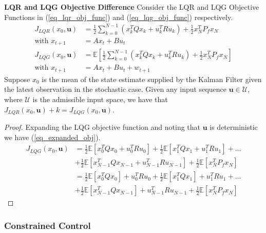 \documentclass[../masters.tex]{subfiles}
\begin{document}
\begin{thrm}
\textbf{LQR and LQG Objective Difference} Consider the LQR and LQG Objective Functions in (\ref{eq_lqr_obj_func}) and (\ref{eq_lqg_obj_func}) respectively. 
\begin{align}
J_{LQR}(x_0, \mathbf{u}) &= \frac{1}{2}\sum_{k=0}^{N-1} \left( x_k^TQx_k + u_k^TRu_k \right) + \frac{1}{2}x_N^TP_fx_N \label{eq_lqr_obj_func}\\
\text{with } x_{t+1} &= Ax_t +Bu_t \nonumber\\
J_{LQG}(x_0, \mathbf{u}) &=  \mathbb{E}\left[ \frac{1}{2}\sum_{k=0}^{N-1} \left( x_k^TQx_k + u_k^TRu_k \right) + \frac{1}{2}x_N^TP_fx_N \right] \label{eq_lqg_obj_func} \\
\text{with } x_{t+1} &= Ax_t +Bu_t + w_{t+1} \nonumber
\end{align}
Suppose $x_0$ is the mean of the state estimate supplied by the Kalman Filter given the latest observation in the stochastic case. Given any input sequence $\mathbf{u} \in \mathcal{U}$, where $\mathcal{U}$ is the admissible input space, we have that $J_{LQR}(x_0, \mathbf{u}) + k = J_{LQG}(x_0, \mathbf{u})$.
\end{thrm}
\begin{proof}
Expanding the LQG objective function and noting that $\mathbf{u}$ is deterministic we have (\ref{eq_expanded_obj}).
\begin{equation}
\begin{aligned}
J_{LQG}(x_0, \mathbf{u}) &= \frac{1}{2} \mathbb{E}\left[x_0^TQx_0 + u_0^TRu_0 \right] + \frac{1}{2} \mathbb{E}\left[x_1^TQx_1 + u_1^TRu_1 \right] + ... \\ &+ \frac{1}{2} \mathbb{E}\left[x_{N-1}^TQx_{N-1} + u_{N-1}^TRu_{N-1} \right] + \frac{1}{2} \mathbb{E}\left[x_N^TP_fx_N \right] \\
&= \frac{1}{2} \mathbb{E}\left[x_0^TQx_0\right] + u_0^TRu_0 + \frac{1}{2} \mathbb{E}\left[x_1^TQx_1\right] + u_1^TRu_1 + ... \\ &+ \frac{1}{2} \mathbb{E}\left[x_{N-1}^TQx_{N-1} \right]+ u_{N-1}^TRu_{N-1} + \frac{1}{2} \mathbb{E}\left[x_N^TP_fx_N \right]
\end{aligned}
\label{eq_expanded_obj}
\end{equation}
\end{proof}


\subsubsection{Constrained Control}















\end{document}
